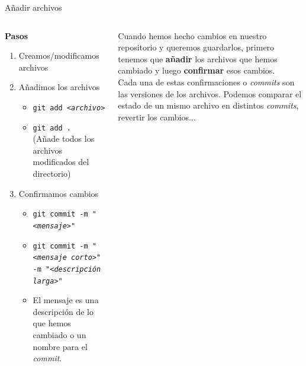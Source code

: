 \documentclass[11pt]{beamer}
\begin{document}
\begin{frame}{Añadir archivos}
	\begin{columns}[c] 
		\begin{column}{0.55\textwidth} %
			\textbf{Pasos}
			\begin{enumerate}
				\item Creamos/modificamos archivos
				\item Añadimos los archivos
                    \begin{itemize}
                        \item \texttt{git add \textit{<archivo>}}
                        \item \texttt{git add .}\\(Añade todos los archivos modificados del directorio)
                    \end{itemize}
				\item Confirmamos cambios
                \begin{itemize}
                    \item \texttt{git commit -m "\textit{<mensaje>}"}
                    \item \texttt{git commit -m "\textit{<mensaje corto>}"}\texttt{ -m "\textit{<descripción larga>}"}
                    \item El mensaje es una descripción de lo que hemos cambiado o un nombre para el \textit{commit}.
                \end{itemize}
			\end{enumerate}
		\end{column}
		\begin{column}{0.45\textwidth} %
			\small Cuando hemos hecho cambios en nuestro repositorio y queremos guardarlos, primero tenemos que \textbf{añadir} los archivos que hemos cambiado y luego \textbf{confirmar} esos cambios.\\
            \smallskip
            Cada una de estas confirmaciones o \textit{commits} son las versiones de los archivos. Podemos comparar el estado de un mismo archivo en distintos \textit{commits}, revertir los cambios...\\
		\end{column}
	\end{columns}
\end{frame}

\end{document}
